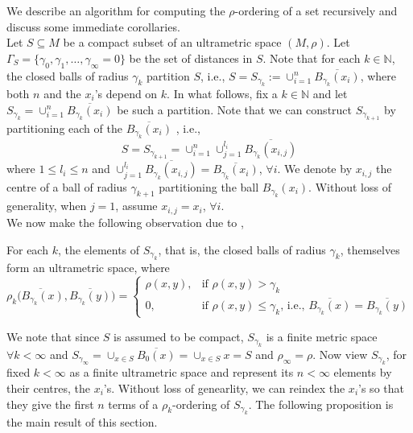We describe an algorithm for computing the $\rho$-ordering of a set recursively and discuss some immediate corollaries.  \\

Let $S \subseteq M$ be a compact subset of an ultrametric space $(M, \rho)$. Let $\Gamma_S =\{\gamma_0, \gamma_1,\ldots,\gamma_\infty=0\}$ be the set of distances in $S$.  Note that for each $k \in \mathbb{N}$, the closed balls of radius $\gamma_k$ partition $S$, i.e., $S=S_{\gamma_k} := \cup_{i=1}^n \overline{B_{\gamma_k}(x_i)}$, where both $n$ and the $x_i$'s depend on $k$. In what follows, fix a $k \in \mathbb{N}$ and let $S_{\gamma_k} = \cup_{i=1}^n \overline{B_{\gamma_k}(x_i)}$ be such a partition. Note that we can construct $S_{\gamma_{k+1}}$ by partitioning each of the $\overline{B_{\gamma_k}(x_i)}$ , i.e., \[S = S_{\gamma_{k+1}} = \cup_{i=1}^n \cup_{j=1}^{l_i} \overline{B_{\gamma_k}(x_{i,j})}\] where $1 \leq l_i \leq n$ and $\cup_{j=1}^{l_i} \overline{B_{\gamma_k}(x_{i,j})}=\overline{B_{\gamma_k}(x_i)}$, $\forall i$. We denote by $x_{i,j}$ the centre of a ball of radius $\gamma_{k+1}$ partitioning the ball $B_{\gamma_k}(x_i)$. Without loss of generality, when $j=1$, assume $x_{i,j}=x_i$, $\forall i$.\\

We now make the following observation due to \cite{na},

\begin{lemma*}
For each $k$, the elements of $S_{\gamma_k}$, that is, the closed balls of radius $\gamma_k$, themselves form an ultrametric space, where 
\[ \rho_k\overline{(B_{\gamma_k}(x)},\overline{B_{\gamma_k}(y)}) = 
\begin{cases}
\rho(x,y), & \text{if } \rho(x,y) > \gamma_k \\
0, & \text{if }   \rho(x,y) \leq \gamma_k \text{, i.e., } \overline{B_{\gamma_k}(x)}=\overline{B_{\gamma_k}(y)}
\end{cases}
\]
\end{lemma*}

We note that since $S$ is assumed to be compact,  $S_{\gamma_k}$ is a finite metric space $\forall k < \infty$ and $S_{\gamma_\infty}=\cup_{x \in S}\overline{B_0(x)} = \cup_{x \in S}x=S$ and $\rho_\infty=\rho$.  Now view $S_{\gamma_k}$, for fixed $k < \infty$ as a finite ultrametric space and represent its $n < \infty$ elements by their centres, the $x_i$'s. Without loss of genearlity, we can reindex the $x_i$'s so that they give the first $n$ terms of a $\rho_k$-ordering of $S_{\gamma_k}$. The following proposition is the main result of this section.

